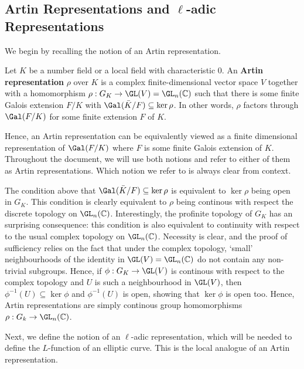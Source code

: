 \subsection{Artin Representations and  \texorpdfstring{$\ell$}{TEXT}-adic Representations} \label{subsection_reps}

We begin by recalling the notion of an Artin representation.

\begin{defn}
    Let $K$ be a number field or a local field with characteristic $0$. An \textbf{Artin representation} $\rho$ over $K$ is a complex finite-dimensional vector space $V$ together with a homomorphism $\rho:G_K\to\GL(V)=\GL_n(\CC)$ such that there is some finite Galois extension $F/K$ with $\Gal(\bar{K}/F)\subseteq\ker\rho$. In other words, $\rho$ factors through $\Gal(F/K)$ for some finite extension $F$ of $K$.
\end{defn}

Hence, an Artin representation can be equivalently viewed as a finite dimensional representation of $\Gal(F/K)$ where $F$ is some finite Galois extension of $K$. Throughout the document, we will use both notions and refer to either of them as Artin representations. Which notion we refer to is always clear from context.

\begin{rem}
    The condition above that $\Gal(\bar{K}/F)\subseteq\ker\rho$ is equivalent to $\ker\rho$ being open in $G_K$. This condition is clearly equivalent to $\rho$ being continous with respect the discrete topology on $\GL_n(\CC)$. Interestingly, the profinite topology of $G_K$ has an surprising consequence: this condition is also equivalent to continuity with respect to the usual complex topology on $\GL_n(\CC)$. Necessity is clear, and the proof of sufficiency relies on the fact that under the complex topology, `small' neighbourhoods of the identity in $\GL(V)=\GL_n(\CC)$ do not contain any non-trivial subgroups. Hence, if $\phi:G_K\to\GL(V)$ is continous with respect to the complex topology and $U$ is such a neighbourhood in $\GL(V)$, then $\phi^{-1}(U)\subseteq\ker\phi$ and $\phi^{-1}(U)$ is open, showing that $\ker\phi$ is open too. Hence, Artin representations are simply continous group homomorphisms $\rho:G_k\to\GL_n(\CC)$.
\end{rem}

Next, we define the notion of an $\ell$-adic representation, which will be needed to define the $L$-function of an elliptic curve. This is the local analogue of an Artin representation.

